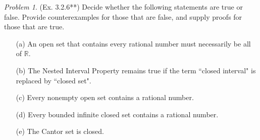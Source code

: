 \documentclass[11pt,twoside, reqno]{amsart}
\theoremstyle{remark}
\newtheorem{Prob}{Problem}
\def\R{\mathbb R}
\begin{document}
\begin{Prob}(Ex. 3.2.6**) Decide whether the following statements are true or false. Provide counterexamples for those that are false, and supply proofs for those that are true.
\begin{enumerate}
    \item [(a)] An open set that contains every rational number must necessarily be all of $\R$.
    \item [(b)] The Nested Interval Property remains true if the term ``closed interval" is replaced by ``closed set".
    \item [(c)] Every nonempty open set contains a rational number.
    \item [(d)] Every bounded infinite closed set contains a rational number.
    \item [(e)] The Cantor set is closed.
\end{enumerate}
\end{Prob}
\end{document}
